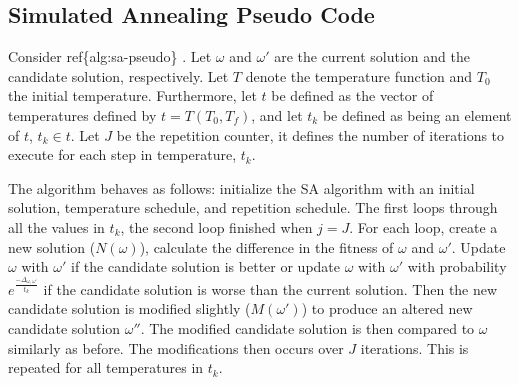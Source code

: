 \documentclass[11pt,a4paper,final]{article}
\newcommand{\Tau}{T}                        %
\begin{document}
\subsection{Simulated Annealing Pseudo Code}
\label{sec:simulated-annealing-pseudo-code}
Consider ref\{alg:sa-pseudo\} \cite{henderson-1989-theor-pract}. Let \(\omega\) and \(\omega'\) are the current solution and the
candidate solution, respectively. Let \(\Tau\) denote the temperature function and \(\Tau_0\) the initial temperature.
Furthermore, let \(t\) be defined as the vector of temperatures defined by \(t = \Tau(\Tau_0, \Tau_f)\), and let \(t_k\) be
defined as being an element of \(t\), \(t_k \in t\). Let \(J\) be the repetition counter, it defines the number of iterations to
execute for each step in temperature, \(t_k\).

The algorithm behaves as follows: initialize the SA algorithm with an initial solution, temperature schedule, and
repetition schedule. The first loops through all the values in \(t_k\), the second loop finished when \(j = J\). For each
loop, create a new solution (\(N(\omega)\)), calculate the difference in the fitness of \(\omega\) and \(\omega'\). Update \(\omega\) with \(\omega'\) if
the candidate solution is better or update \(\omega\) with \(\omega'\) with probability \(e^{\frac{-\Delta_{\omega , \omega'}}{t_k}}\) if the candidate
solution is worse than the current solution. Then the new candidate solution is modified slightly (\(M(\omega')\)) to produce
an altered new candidate solution \(\omega{''}\). The modified candidate solution is then compared to \(\omega\) similarly as before.
The modifications then occurs over \(J\) iterations. This is repeated for all temperatures in \(t_k\).
\end{document}
